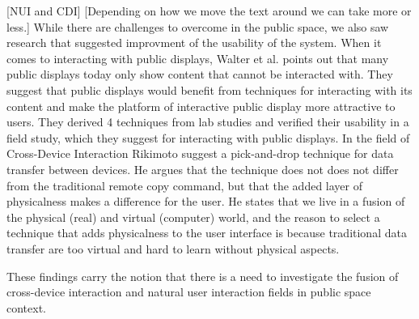 {[NUI  and CDI]
[Depending on how we move the text around we can take more or less.]
While there are challenges to overcome in the public space, we also saw research that suggested improvment of the usability of the system. When it comes to interacting with public displays, Walter et al. \protect\cite{Walter:2014} points out that many public displays today only show content that cannot be interacted with. They suggest that public displays would benefit from techniques for interacting with its content and make the platform of interactive public display more attractive to users. They derived 4 techniques from lab studies and verified their usability in a field study, which they suggest for interacting with public displays. 
In the field of Cross-Device Interaction Rikimoto \protect\cite{Rekimoto:1997} suggest a pick-and-drop technique for data transfer between devices. He argues that the technique does not does not differ from the traditional remote copy command, but that the added layer of physicalness makes a difference for the user. He states that we live in a fusion of the physical (real) and virtual (computer) world, and the reason to select a technique that adds physicalness to the user interface is because traditional data transfer are too virtual and hard to learn without physical aspects.

 These findings carry the notion that there is a need to investigate the fusion of cross-device interaction and natural user interaction fields in public space context.} %


